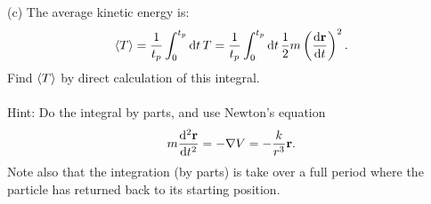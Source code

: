 \documentclass{article}
\begin{document}
        (c) The average kinetic energy is:
        \begin{equation*}
            \expval{T} = \frac{1}{t_p} \int_0^{t_p} \dd t\, T = \frac{1}{t_p} \int_0^{t_p} \dd t \, \frac{1}{2} m \left(\dv{\mathbf{r}}{t}\right)^2.
        \end{equation*}
        Find $\expval{T}$ by direct calculation of this integral. \\ \\
        Hint: Do the integral by parts, and use Newton's equation
        \begin{equation*}
            m \dv[2]{\mathbf{r}}{t} = - \nabla V = - \frac{k}{r^3} \mathbf{r}.
        \end{equation*}
        Note also that the integration (by parts) is take over a full period where the particle has returned back to its starting position.
\end{document}
